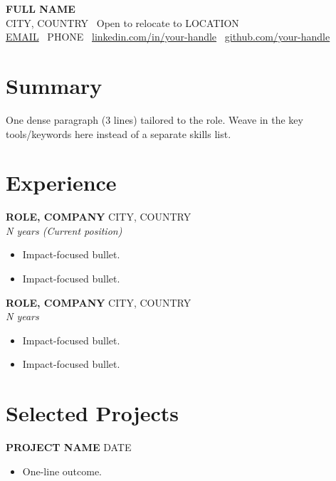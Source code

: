 \documentclass[10pt,a4paper]{article}
\begin{document}
{\LARGE \textbf{\color{emphasis}FULL NAME}}\\
CITY, COUNTRY \textbar\ Open to relocate to LOCATION\\
\href{mailto:EMAIL}{EMAIL} \textbar\ PHONE \textbar\
\href{LINKEDIN_URL}{linkedin.com/in/your-handle} \textbar\
\href{GITHUB_URL}{github.com/your-handle}

\section*{Summary}
One dense paragraph (3 lines) tailored to the role. Weave in the key tools/keywords here
instead of a separate skills list.

\section*{Experience}
\textbf{ROLE, COMPANY} \hfill CITY, COUNTRY\\
\textit{N years (Current position)}
\begin{itemize}
  \item Impact-focused bullet.
  \item Impact-focused bullet.
\end{itemize}

\textbf{ROLE, COMPANY} \hfill CITY, COUNTRY\\
\textit{N years}
\begin{itemize}
  \item Impact-focused bullet.
  \item Impact-focused bullet.
\end{itemize}

\section*{Selected Projects}
\textbf{PROJECT NAME}  \hfill DATE
\begin{itemize}
  \item One-line outcome.
\end{itemize}
\end{document}
